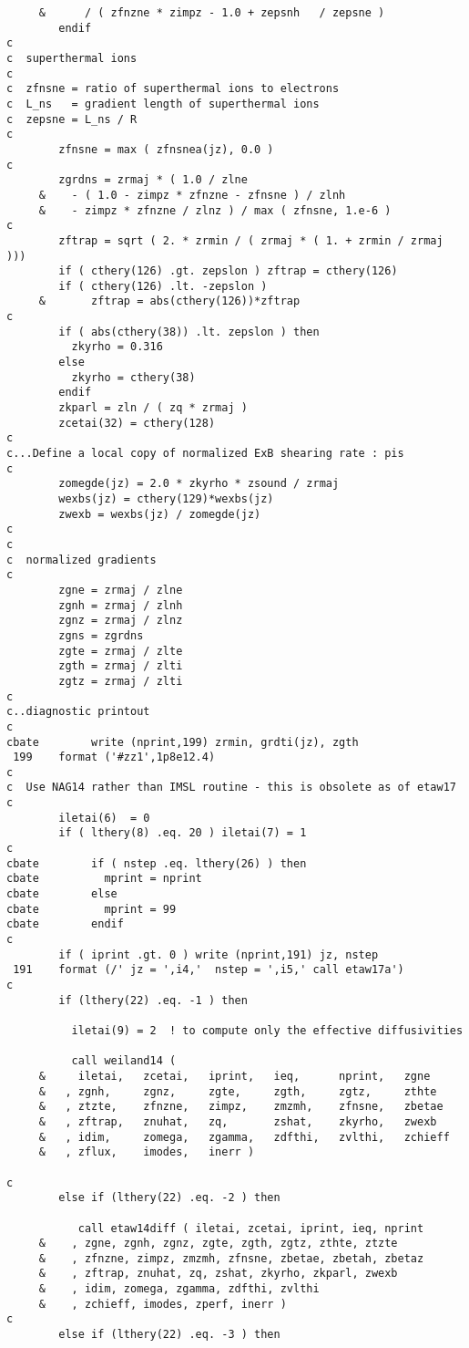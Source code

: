 \begin{verbatim}
     &      / ( zfnzne * zimpz - 1.0 + zepsnh   / zepsne )
        endif
c
c  superthermal ions
c
c  zfnsne = ratio of superthermal ions to electrons
c  L_ns   = gradient length of superthermal ions
c  zepsne = L_ns / R
c
        zfnsne = max ( zfnsnea(jz), 0.0 )
c
        zgrdns = zrmaj * ( 1.0 / zlne
     &    - ( 1.0 - zimpz * zfnzne - zfnsne ) / zlnh
     &    - zimpz * zfnzne / zlnz ) / max ( zfnsne, 1.e-6 )
c
        zftrap = sqrt ( 2. * zrmin / ( zrmaj * ( 1. + zrmin / zrmaj )))
        if ( cthery(126) .gt. zepslon ) zftrap = cthery(126)
        if ( cthery(126) .lt. -zepslon )
     &       zftrap = abs(cthery(126))*zftrap
c
        if ( abs(cthery(38)) .lt. zepslon ) then
          zkyrho = 0.316
        else
          zkyrho = cthery(38)
        endif
        zkparl = zln / ( zq * zrmaj )
        zcetai(32) = cthery(128)
c
c...Define a local copy of normalized ExB shearing rate : pis
c
        zomegde(jz) = 2.0 * zkyrho * zsound / zrmaj 
        wexbs(jz) = cthery(129)*wexbs(jz)
        zwexb = wexbs(jz) / zomegde(jz) 
c
c
c  normalized gradients
c
        zgne = zrmaj / zlne
        zgnh = zrmaj / zlnh
        zgnz = zrmaj / zlnz
        zgns = zgrdns
        zgte = zrmaj / zlte
        zgth = zrmaj / zlti
        zgtz = zrmaj / zlti
c
c..diagnostic printout
c
cbate        write (nprint,199) zrmin, grdti(jz), zgth
 199    format ('#zz1',1p8e12.4)
c
c  Use NAG14 rather than IMSL routine - this is obsolete as of etaw17 
c
        iletai(6)  = 0
        if ( lthery(8) .eq. 20 ) iletai(7) = 1
c
cbate        if ( nstep .eq. lthery(26) ) then
cbate          mprint = nprint
cbate        else
cbate          mprint = 99
cbate        endif
c
        if ( iprint .gt. 0 ) write (nprint,191) jz, nstep
 191    format (/' jz = ',i4,'  nstep = ',i5,' call etaw17a')
c
        if (lthery(22) .eq. -1 ) then

          iletai(9) = 2  ! to compute only the effective diffusivities

          call weiland14 ( 
     &     iletai,   zcetai,   iprint,   ieq,      nprint,   zgne
     &   , zgnh,     zgnz,     zgte,     zgth,     zgtz,     zthte
     &   , ztzte,    zfnzne,   zimpz,    zmzmh,    zfnsne,   zbetae
     &   , zftrap,   znuhat,   zq,       zshat,    zkyrho,   zwexb
     &   , idim,     zomega,   zgamma,   zdfthi,   zvlthi,   zchieff
     &   , zflux,    imodes,   inerr )

c
        else if (lthery(22) .eq. -2 ) then

           call etaw14diff ( iletai, zcetai, iprint, ieq, nprint
     &    , zgne, zgnh, zgnz, zgte, zgth, zgtz, zthte, ztzte
     &    , zfnzne, zimpz, zmzmh, zfnsne, zbetae, zbetah, zbetaz
     &    , zftrap, znuhat, zq, zshat, zkyrho, zkparl, zwexb
     &    , idim, zomega, zgamma, zdfthi, zvlthi
     &    , zchieff, imodes, zperf, inerr )
c
        else if (lthery(22) .eq. -3 ) then


\end{verbatim}
